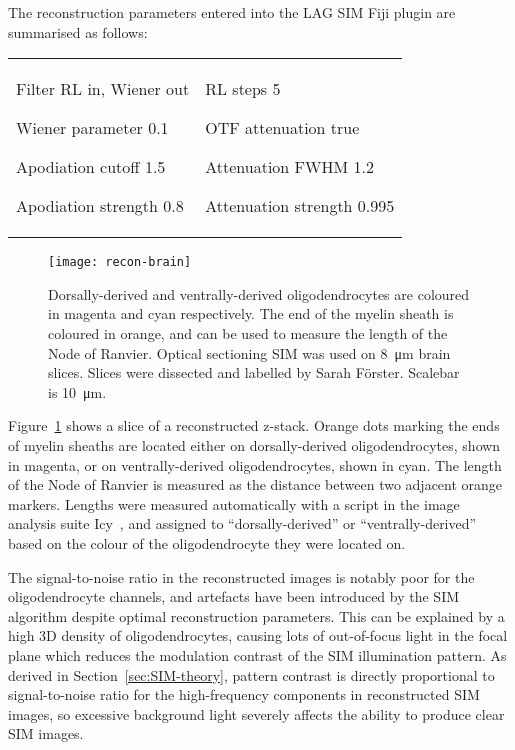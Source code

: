 The reconstruction parameters entered into the LAG SIM Fiji plugin are summarised as follows:\newline
\begin{tabular}{p{}p{}}
\begin{labelling}[margin={Attenuation strength}]
	\item[Filter] RL in, Wiener out
	\item[Wiener parameter] 0.1
	\item[Apodiation cutoff] 1.5
	\item[Apodiation strength] 0.8
\end{labelling} &
\begin{labelling}[margin={Attenuation strength}]
	\item[RL steps] 5
	\item[OTF attenuation] true
	\item[Attenuation FWHM] 1.2
	\item[Attenuation strength] 0.995 
\end{labelling}
\end{tabular}

\begin{figure}[tbp!]
\centering
\texttt{[image: recon-brain]}
\caption[LAG SIM: Multi-colour optical sectioning SIM to measure the Node of Ranvier on ventrally- and dorsally-derived oligodendrocytes]{Dorsally-derived and ventrally-derived oligodendrocytes are coloured in magenta and cyan respectively. The end of the myelin sheath is coloured in orange, and can be used to measure the length of the Node of Ranvier. Optical sectioning SIM was used on \SI{8}{\micro\metre} brain slices. Slices were dissected and labelled by Sarah F{\"o}rster. Scalebar is \SI{10}{\micro\metre}. }
\label{fig:recon-brain}
\end{figure}
\afterpage{\clearpage}

Figure~\ref{fig:recon-brain} shows a slice of a reconstructed z-stack. 
Orange dots marking the ends of myelin sheaths are located either on dorsally-derived oligodendrocytes, shown in magenta, or on ventrally-derived oligodendrocytes, shown in cyan. 
The length of the Node of Ranvier is measured as the distance between two adjacent orange markers.
Lengths were measured automatically with a script in the image analysis suite Icy~\cite{de2012icy}, and assigned to ``dorsally-derived'' or ``ventrally-derived'' based on the colour of the oligodendrocyte they were located on. 

The signal-to-noise ratio in the reconstructed images is notably poor for the oligodendrocyte channels, and artefacts have been introduced by the SIM algorithm despite optimal reconstruction parameters. 
This can be explained by a high 3D density of oligodendrocytes, causing lots of out-of-focus light in the focal plane which reduces the modulation contrast of the SIM illumination pattern. 
As derived in Section~\ref{sec:SIM-theory}, pattern contrast is directly proportional to signal-to-noise ratio for the high-frequency components in reconstructed SIM images, so excessive background light severely affects the ability to produce clear SIM images. 

